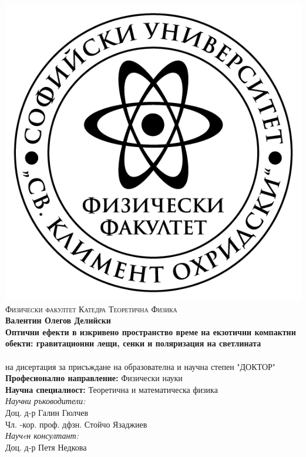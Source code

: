 \documentclass[12pt]{article}
\numberwithin{equation}{section}
\numberwithin{figure}{section}
\begin{document}
	
\thispagestyle{empty}
\begin{center}
	
	\centering
	\includegraphics[scale = 1]{Title_page/logo-FzF.png}
	\noindent\makebox[\linewidth]{\rule{15cm}{0.8pt}}
	\textsc{Физически факултет}
	\noindent\makebox[\linewidth]{\rule{15cm}{0.8pt}}
	\textsc{Катедра Теоретична	 Физика}\\
	\bigskip
	\bigskip
	\bigskip
	\bigskip
	{\Large{\textbf{Валентин Олегов Делийски}}}\\
	\bigskip
	\bigskip
	\bigskip
	{\Large \textbf{Оптични ефекти в изкривено пространство време на екзотични компактни обекти: гравитационни лещи, сенки и поляризация на светлината}}\\
	\bigskip
	\bigskip
	\bigskip
	{\textbf{\huge {}}}\\
	\bigskip
	на дисертация за присъждане на образователна и научна степен "ДОКТОР"\\
	\bigskip
	\bigskip
	\bigskip
	\textbf{Професионално направление:} Физически науки\\
	\textbf{Научна специалност:} Теоретична и математическа физика\\
	\bigskip
	\bigskip
	\bigskip
	\bigskip
	\textit{Научни ръководители:}\\
	Доц. д-р Галин Гюлчев\\
	\bigskip
	Чл. -кор. проф. дфзн. Стойчо Язаджиев\\
	\bigskip
	\textit{Научeн консултант:}\\
	Доц. д-р Петя Недкова\\
	
	\newpage
\end{center}
\end{document}
